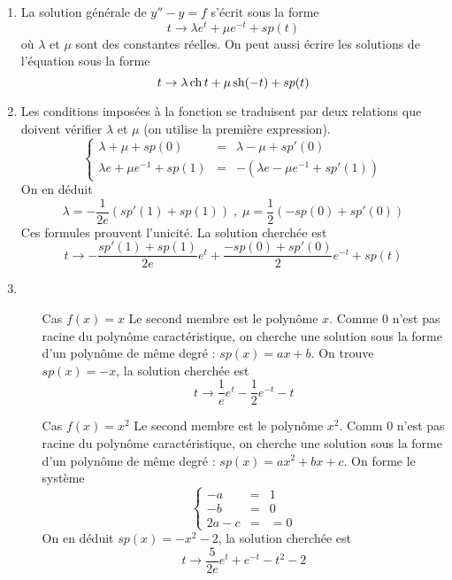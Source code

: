 \begin{enumerate}
\item La solution générale de $y''-y=f$ s'écrit sous la forme
\[t\rightarrow \lambda e^{t}+\mu e^{-t}+sp(t)\]
où $\lambda$ et $\mu$ sont des constantes réelles. On peut aussi écrire les solutions de l'équation sous la forme
\[t\rightarrow \lambda \operatorname{ch} t+\mu \operatorname{sh} (-t)+sp(t)\]
\item Les conditions imposées à la fonction se traduisent par deux relations que doivent vérifier $\lambda$ et $\mu$ (on utilise la première expression).
\[\left\lbrace \begin{array}{ccc}
 \lambda + \mu +sp(0)&=  &\lambda -\mu + sp'(0) \\ 
 \lambda e + \mu e^{-1} +sp(1)&=  & -(\lambda e - \mu e^{-1}+sp'(1)) 
\end{array}\right. \]
On en déduit
\[\lambda=-\frac{1}{2e}(sp'(1)+sp(1)) \;,\; \mu=\frac{1}{2}(-sp(0)+sp'(0))\]
Ces formules prouvent l'unicité. La solution cherchée est
\begin{displaymath}
t\rightarrow -\frac{sp'(1)+sp(1)}{2e}e^{t} + \frac{-sp(0)+sp'(0)}{2}e^{-t} + sp(t)  
\end{displaymath}

\item \begin{itemize}
\item[Cas $f(x)=x$] Le second membre est le polynôme $x$. Comme 0 n'est pas racine du polynôme caractéristique, on cherche une solution sous la forme d'un polynôme de même degré : $sp(x)=ax+b$. On trouve $sp(x)=-x$, la solution cherchée est
\[t\rightarrow \frac{1}{e}e^{t}-\frac{1}{2}e^{-t}-t\]
\item[Cas $f(x)=x^2$] Le second membre est le polynôme $x^2$. Comm 0 n'est pas racine du polynôme caractéristique, on cherche une solution sous la forme d'un polynôme de même degré : $sp(x)=ax^2+bx+c$. On forme le système
\[\left\lbrace \begin{array}{ccc}
-a & = & 1 \\ 
-b & = & 0 \\ 
2a-c & = & =0
\end{array}\right. \]
On en déduit $sp(x)=-x^2-2$, la solution cherchée est
\[t\rightarrow \frac{5}{2e}e^{t}+e^{-t}-t^2-2\]

\end{itemize}

\end{enumerate}
